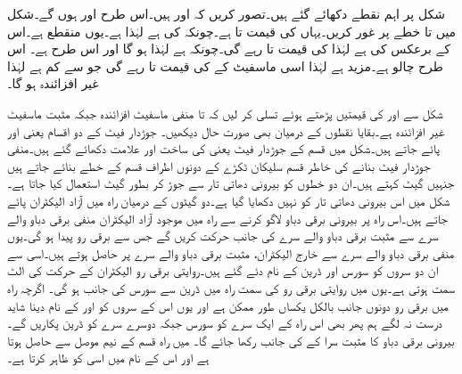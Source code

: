 شکل  پر اہم نقطے دکھائے گئے ہیں۔تصور کریں کہ  اور  ہیں۔اس طرح  اور  ہوں  گے۔شکل میں  تا  خطے پر غور کریں۔یہاں  کی قیمت  تا  ہے۔چونکہ  کی  ہے  لہٰذا  ہے۔یوں  منقطع ہے۔اس کے برعکس  کی  ہے لہٰذا  کی قیمت  تا  رہے گی۔چونکہ  ہے لہٰذا  ہو گا اور اس طرح  ہے۔ اس طرح   چالو ہے۔مزید  ہے لہٰذا اسی ماسفیٹ کے   کی قیمت  تا  رہے گی  جو  سے کم ہے لہٰذا  غیر افزائندہ ہو گا۔ 

شکل  سے  اور   کی قیمتیں پڑھتے ہوئے تسلی کر لیں کہ  تا  منفی ماسفیٹ افزائندہ جبکہ مثبت ماسفیٹ غیر افزائندہ ہے۔بقایا نقطوں کے درمیان بھی صورت حال دیکھیں۔ 
جوڑدار فیٹ کے دو اقسام یعنی  اور  پائے جاتے ہیں۔شکل  میں  قسم کے جوڑدار فیٹ یعنی  کی ساخت اور علامت دکھائے گئے ہیں۔منفی جوڑدار فیٹ بنانے کی خاطر  قسم سلیکان ٹکڑے کے دونوں اطراف  قسم کے خطے بنائے جاتے ہیں جنہیں گیٹ کہتے ہیں۔ان دو خطوں کو بیرونی دھاتی تار سے جوڑ کر بطور گیٹ  استعمال کیا جاتا ہے۔شکل میں اس بیرونی دھاتی تار کو نہیں دکھایا گیا ہے۔دو گیٹوں کے درمیان راہ میں آزاد الیکٹران پائے جاتے ہیں۔اس راہ پر بیرونی برقی دباو  لاگو کرنے سے راہ میں موجود آزاد الیکٹران منفی برقی دباو والے سرے سے مثبت برقی دباو والے سرے کی جانب حرکت کریں گے جس سے برقی رو  پیدا ہو گی۔یوں منفی برقی دباو والے سرے سے خارج الیکٹران، مثبت برقی دباو والے سرے پر حاصل ہوتے ہیں۔اسی سے ان دو سروں کو سورس  اور ڈرین  کے نام دئے گئے ہیں۔روایتی برقی رو الیکٹران کے حرکت کی الٹ سمت ہوتی ہے۔یوں  میں روایتی برقی رو کی سمت راہ میں ڈرین سے سورس کی جانب ہو گی۔ اگرچہ راہ میں برقی رو دونوں جانب بالکل یکساں طور ممکن ہے اور یوں اس کے سروں کو  اور  کے نام دینا شاید درست نہ لگے ہم پھر بھی اس راہ کے ایک سرے کو سورس  جبکہ دوسرے سرے کو ڈرین  پکاریں گے۔بیرونی برقی دباو کا مثبت سرا  کے  کی جانب رکھا جائے گا۔ میں راہ  قسم کے نیم موصل سے حاصل ہوتا ہے اور اس کے نام میں  اسی  کو ظاہر کرتا ہے۔

